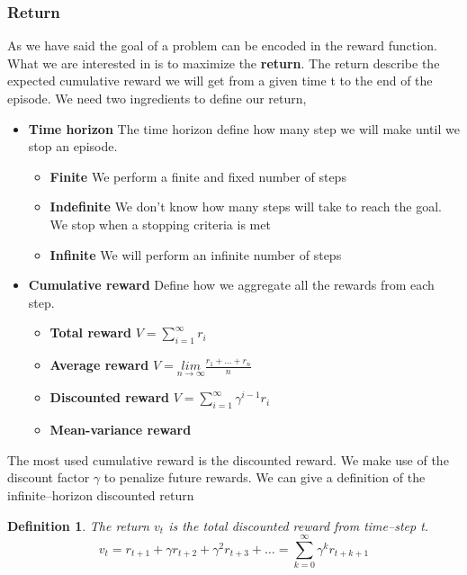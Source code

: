 \documentclass[main.tex]{subfiles}
\newtheorem{definition}{Definition}[section]
\begin{document}
\subsubsection{Return}
As we have said the goal of a problem can be encoded in the reward function. What we are interested in is to maximize the \textbf{return}. The return describe the expected cumulative reward we will get from a given time t to the end of the episode. We need two ingredients to define our return,
\begin{itemize}
    \item \textbf{Time horizon} The time horizon define how many step we will make until we stop an episode.
    \begin{itemize}
        \item \textbf{Finite} We perform a finite and fixed number of steps
        \item \textbf{Indefinite} We don't know how many steps will take to reach the goal. We stop when a stopping criteria is met
        \item \textbf{Infinite} We will perform an infinite number of steps
    \end{itemize}
    \item \textbf{Cumulative reward} Define how we aggregate all the rewards from each step.
    \begin{itemize}
        \item \textbf{Total reward} $V = \sum_{i=1}^{\infty} r_i$
        \item \textbf{Average reward} $V = \underset{n \rightarrow \infty}{lim} \frac{r_1 + \dots + r_n}{n}$
        \item \textbf{Discounted reward} $V = \sum_{i=1}^{\infty} \gamma^{i-1} r_i$
        \item \textbf{Mean-variance reward}
    \end{itemize}
\end{itemize}
The most used cumulative reward is the discounted reward. We make use of the discount factor $\gamma$ to penalize future rewards. We can give a definition of the infinite–horizon discounted return
\begin{definition}
The return $v_t$ is the total discounted reward from time–step t.
\begin{equation}
    v_t = r_{t+1} + \gamma r_{t+2} + \gamma^2 r_{t+3} + \dots = \sum_{k=0}^{\infty} \gamma^k r_{t+k+1}
\end{equation}
\end{definition}
\end{document}
